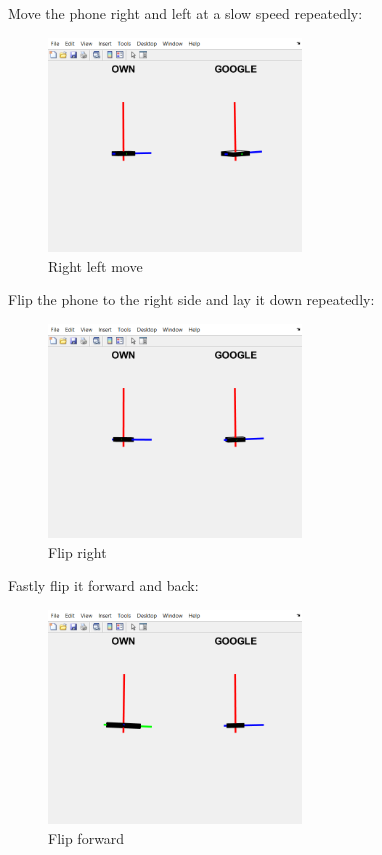 Move the phone right and left at a slow speed repeatedly:

\begin{figure}[H]
 \centering
 \includegraphics[width=0.6\textwidth]{images/rightleft.png}
 \caption{Right left move }
 \label{rightleft}
\end{figure}

Flip the phone to the right side and lay it down repeatedly:
\begin{figure}[H]
 \centering
 \includegraphics[width=0.6\textwidth]{images/flipright.png}
 \caption{Flip right}
 \label{flipright}
\end{figure}

Fastly flip it forward and back:

\begin{figure}[H]
 \centering
 \includegraphics[width=0.6\textwidth]{images/forward.png}
 \caption{Flip forward}
 \label{flipforward}
\end{figure}

